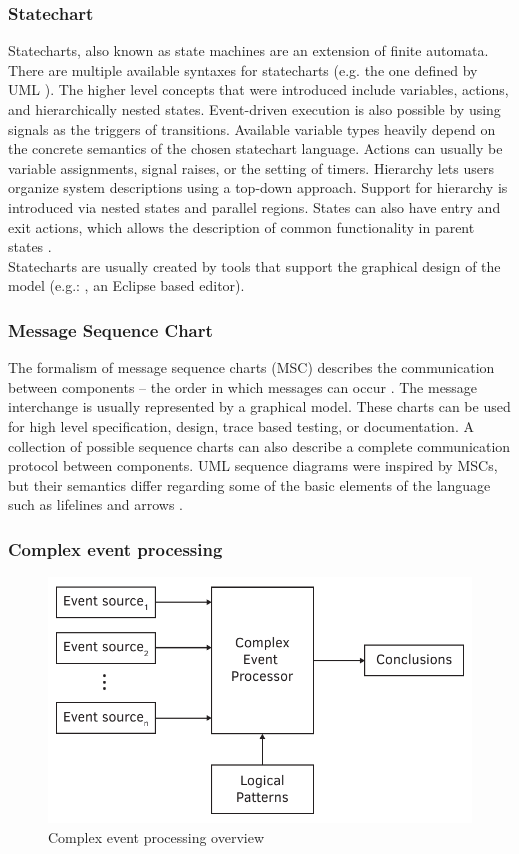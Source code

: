 \subsubsection{Statechart}

Statecharts, also known as state machines are an extension of finite automata. There are multiple available syntaxes for statecharts (e.g. the one defined by UML \citep{stcuml}). The higher level concepts that were introduced include variables, actions, and hierarchically nested states. Event-driven execution is also possible by using signals as the triggers of transitions. Available variable types heavily depend on the concrete semantics of the chosen statechart language. Actions can usually be variable assignments, signal raises, or the setting of timers. Hierarchy lets users organize system descriptions using a top-down approach. Support for hierarchy is introduced via nested states and parallel regions. States can also have entry and exit actions, which allows the description of common functionality in parent states \citep{stcmove}.\\
Statecharts are usually created by tools that support the graphical design of the model (e.g.: \citep{yakinduu}, an Eclipse based editor).


\subsubsection{Message Sequence Chart}

The formalism of message sequence charts (MSC) describes the communication between components -- the order in which messages can occur \citep{msc} \citep{msc2}. The message interchange is usually represented by a graphical model. These charts can be used for high level specification, design, trace based testing, or documentation. A collection of possible sequence charts can also describe a complete communication protocol between components. UML sequence diagrams were inspired by MSCs, but their semantics differ regarding some of the basic elements of the language such as lifelines and arrows \citep{mscuml}.

\subsubsection{Complex event processing}

\begin{figure}[h]
	\centering
	\includegraphics[width=0.7\linewidth]{include/figures/chapter_1/CEP}
	\caption{Complex event processing overview}
	\label{fig:intro:vmodel}
\end{figure}

